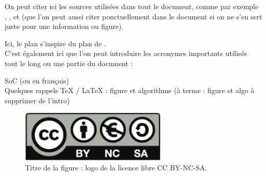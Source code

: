 \documentclass[a4paper,11pt]{article}
\begin{document}
On peut citer ici les sources utilisées dans tout le document, comme par exemple \cite{monlyceenumerique}, \cite{pixees}, \cite{lecluse} et \cite{lewebpedagogique} (que l'on peut aussi citer ponctuellement dans le document si on ne s'en sert juste pour une information ou figure). %

Ici, le plan s'inspire du plan de \cite{monlyceenumerique}.
\\ %


C'est également ici que l'on peut introduire les acronymes importants utilisés tout le long ou une partie du document :

SoC (\fg ou \fg en français)
\\

Quelques rappels TeX / LaTeX : figure et algorithme (à terme : figure et algo à supprimer de l'intro)
\begin{figure}[!h] %
\begin{center}
  \includegraphics[height=2.5cm]{by-nc-sa} %
  \caption{Titre de la figure : logo de la licence libre CC BY-NC-SA.}
  \label{fig1}
\end{center}
\end{figure}
\end{document}
